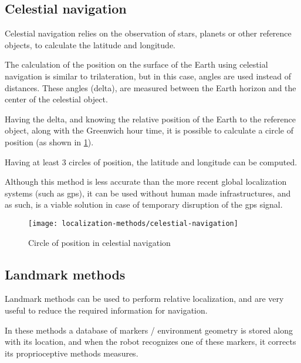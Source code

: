 \subsection{Celestial navigation}

Celestial navigation \cite{Yang2011} relies on the observation of stars, planets or other reference objects, to calculate the latitude and longitude.

The calculation of the position on the surface of the Earth using celestial navigation is similar to trilateration, but in this case, angles are used instead of distances. These angles (delta), are measured between the Earth horizon and the center of the celestial object.

Having the delta, and knowing the relative position of the Earth to the reference object, along with the Greenwich hour time, it is possible to calculate a circle of position (as shown in \cref{fig:localization-methods_celestial-navigation}).

Having at least 3 circles of position, the latitude and longitude can be computed.

Although this method is less accurate than the more recent global localization systems (such as \gls{gps}), it can be used without human made infrastructures, and as such, is a viable solution in case of temporary disruption of the \gls{gps} signal.

\begin{figure}[H]
	\centering
	\texttt{[image: localization-methods/celestial-navigation]}
	\caption[Circle of position in celestial navigation]{Circle of position in celestial navigation\protect\footnotemark}
	\label{fig:localization-methods_celestial-navigation}
\end{figure}


\subsection{Landmark methods}

Landmark methods \cite{Lee2006} can be used to perform relative localization, and are very useful to reduce the required information for navigation.

In these methods a database of markers / environment geometry is stored along with its location, and when the robot recognizes one of these markers, it corrects its proprioceptive methods measures.

